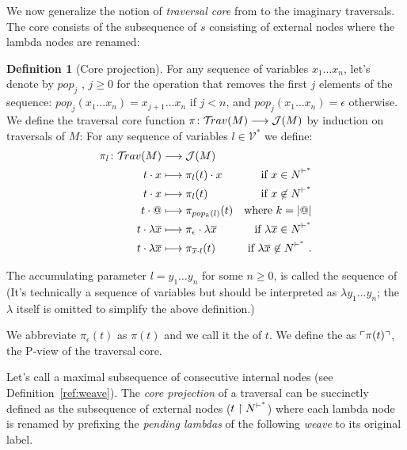 \documentclass{article}
\theoremstyle{definition}
\newtheorem{definition}{Definition}[section]
\newcommand\Nodes{N}%
\newcommand{\travulc}{\travset}
\def\coresymbol{\pi} %
\newcommand{\core}[1]{\coresymbol(#1)} %
\newcommand{\enables}{\vdash} %
\newcommand{\NodeHjByRoot}{\Nodes^{\enables^*}} %
\def\justseqset{\mathcal{J}}
\begin{document}
We now generalize the notion of \emph{traversal core} from \cite{BlumPhd} to the imaginary traversals.
The core consists of the subsequence of $s$ consisting of external nodes where the lambda nodes are renamed:
\begin{definition}[Core projection]
  \label{labe:coreprojection}
  For any sequence of variables $x_1 \ldots x_n$, let's denote by $pop_j$ , $j\geq0$ for the operation that removes the first $j$ elements of the sequence: $pop_j (x_1 \ldots x_n) = x_{j+1} \ldots x_n$ if $j<n$, and $pop_j (x_1 \ldots x_n) = \epsilon$ otherwise.
  We define the traversal core function $\pi \colon \travulc(M) \longrightarrow \justseqset(M)$ by induction on traversals of $M$:
For any sequence of variables $l \in \mathcal{V}^*$ we define:
\begin{align*}
\pi_l \colon \travulc(M) & \longrightarrow \justseqset(M) \\
 t\cdot x &\longmapsto \coresymbol_l(t) \cdot x & \mbox{if } x\in \NodeHjByRoot \\
 t\cdot x &\longmapsto \coresymbol_l(t) & \mbox{if } x\not\in\NodeHjByRoot \\
 t\cdot @ &\longmapsto \coresymbol_{pop_k(l)}(t) & \mbox{where $k = |@|$} \\
 t\cdot \lambda \overline{x} & \longmapsto \coresymbol_{\epsilon} \cdot \lambda \overline{x} & \mbox{if } \lambda \overline{x}\in \NodeHjByRoot \\
 t\cdot \lambda \overline{x} & \longmapsto \coresymbol_{\overline{x} \cdot l}(t) & \mbox{if } \lambda \overline{x}\not\in \NodeHjByRoot \ .
\end{align*}

The accumulating parameter $l = y_1 \ldots y_n$ for some $n\geq0$, is called the sequence of  (It's technically a sequence of variables but should be interpreted as $\lambda y_1 \ldots y_n$; the $\lambda$ itself is omitted to simplify the above definition.)

We abbreviate $\coresymbol_\epsilon(t)$ as $\core{t}$ and we call it the  of $t$.
We define the  as $\pview{\core{t}}$, the P-view of the traversal core.
\end{definition}

Let's call  a maximal subsequence of consecutive internal nodes (see Definition~\ref{ref:weave}). The \emph{core projection} of a traversal can be succinctly defined as the subsequence of external nodes ($t\filter\NodeHjByRoot$) where each lambda node is renamed by prefixing the \emph{pending lambdas} of the following \emph{weave} to its original label.
\end{document}
